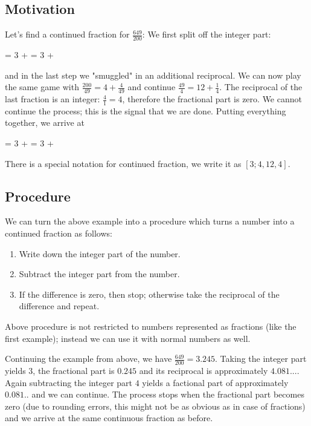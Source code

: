 
\subsection{Motivation}

Let's find a continued fraction for $\frac{649}{200}$: We first split off the integer part:

\bee
{} = 3 + = 3 + 
\eee

and in the last step we "smuggled" in an additional reciprocal. We can now play the same game with $\frac{200}{49} = 4 + \frac{4}{49}$ and continue $\frac{49}{4} = 12 + \frac{1}{4}$. The reciprocal of the last fraction is an integer: $\frac{4}{1}= 4$, therefore the fractional part is zero. We cannot continue the process; this is the signal that we are done. Putting everything together, we arrive at

\bee
{} = 3 +  = 3 + 
\eee

There is a special notation for continued fraction, we write it as $[3;4,12,4]$.

\subsection{Procedure}

We can turn the above example into a procedure which turns a number into a continued fraction as follows:

\begin{enumerate}
	\item Write down the integer part of the number.

	\item Subtract the integer part from the number.

	\item If the difference is zero, then stop; otherwise take the reciprocal of the difference and repeat.
\end{enumerate}

Above procedure is not restricted to numbers represented as fractions (like the first example); instead we can use it with normal numbers as well.

Continuing the example from above, we have $\frac{649}{200} = 3.245$. Taking the integer part yields $3$, the fractional part is $0.245$ and its reciprocal is approximately $4.081...$. Again subtracting the integer part $4$ yields a factional part of approximately $0.081..$ and we can continue. The process stops when the fractional part becomes zero (due to rounding errors, this might not be as obvious as in case of fractions) and we arrive at the same continuous fraction as before.

